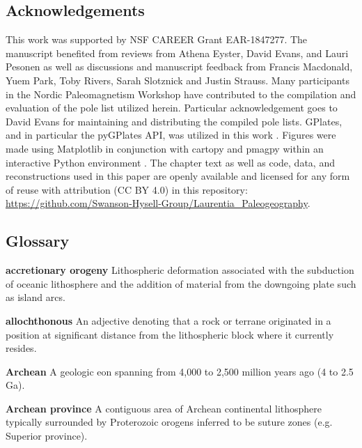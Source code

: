 \documentclass[twocolumn, switch]{article} %
\begin{document}

\footnotesize
\subsection*{Acknowledgements}
This work was supported by NSF CAREER Grant EAR-1847277. The manuscript benefited from reviews from Athena Eyster, David Evans, and Lauri Pesonen as well as discussions and manuscript feedback from Francis Macdonald, Yuem Park, Toby Rivers, Sarah Slotznick and Justin Strauss. Many participants in the Nordic Paleomagnetism Workshop have contributed to the compilation and evaluation of the pole list utilized herein. Particular acknowledgement goes to David Evans for maintaining and distributing the compiled pole lists. GPlates, and in particular the pyGPlates API, was utilized in this work \citep{Muller2018b}. Figures were made using Matplotlib \citep{Hunter2007a} in conjunction with cartopy \citep{Met-Office2010a} and pmagpy \citep{Tauxe2016a} within an interactive Python environment \citep{Perez2007a}. The chapter text as well as code, data, and reconstructions used in this paper are openly available and licensed for any form of reuse with attribution (CC BY 4.0) in this repository: \url{https://github.com/Swanson-Hysell-Group/Laurentia_Paleogeography}.

\subsection*{Glossary}
\noindent\textbf{accretionary orogeny } Lithospheric deformation associated with the subduction of oceanic lithosphere and the addition of material from the downgoing plate such as island arcs.

\noindent\textbf{allochthonous } An adjective denoting that a rock or terrane originated in a position at significant distance from the lithospheric block where it currently resides.

\noindent\textbf{Archean } A geologic eon spanning from 4,000 to 2,500 million years ago (4 to 2.5 Ga).

\noindent\textbf{Archean province } A contiguous area of Archean continental lithosphere typically surrounded by Proterozoic orogens inferred to be suture zones (e.g. Superior province).
\end{document}

